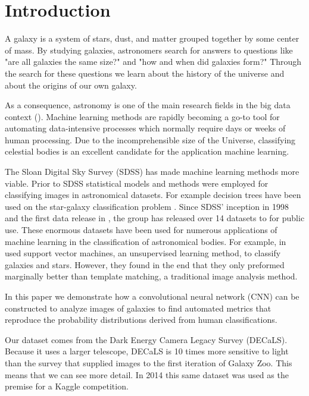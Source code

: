\section{Introduction}


A galaxy is a system of stars, dust, and matter grouped together by some center of mass. By studying galaxies, astronomers search for answers to questions like "are all galaxies the same size?" and "how and when did galaxies form?" Through the search for these questions we learn about the history of the universe and about the origins of our own galaxy.


As a consequence, astronomy is one of the main research fields in the big data context (\citeauthor{microsoft-galaxies}). Machine learning methods are rapidly becoming a go-to tool for automating data-intensive processes which normally require days or weeks of human processing. Due to the incomprehensible size of the Universe, classifying celestial bodies is an excellent candidate for the application machine learning.

The Sloan Digital Sky Survey (SDSS) has made machine learning methods more viable. Prior to SDSS statistical models and methods were employed for classifying images in astronomical datasets. For example decision trees have been used on the star-galaxy classification problem \cite{ball-decision-trees}. Since SDSS' inception in 1998 and the first data release in \citeyear{sdss-segue-1}, the group has released over 14 datasets to for public use. These enormous datasets have been used for numerous applications of machine learning in the classification of astronomical bodies. For example, \citeauthor{svn-galaxy} in \citeyear{svn-galaxy} used support vector machines, an unsupervised learning method, to classify galaxies and stars. However, they found in the end that they only preformed marginally better than template matching, a traditional image analysis method. \cite{svn-galaxy}

In this paper we demonstrate how a convolutional neural network (CNN) can be constructed to analyze images of galaxies to find automated metrics that reproduce the probability distributions derived from human classifications.

Our dataset comes from the Dark Energy Camera Legacy Survey (DECaLS). Because it uses a larger telescope, DECaLS is 10 times more sensitive to light than the survey that supplied images to the first iteration of Galaxy Zoo. This means that we can see more detail. \cite{zooniverse} In 2014 this same dataset was used as the premise for a Kaggle competition.

